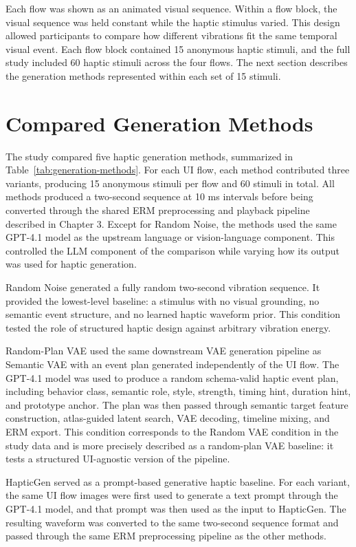 Each flow was shown as an animated visual sequence. Within a flow block, the visual sequence was held constant while the haptic stimulus varied. This design allowed participants to compare how different vibrations fit the same temporal visual event. Each flow block contained 15 anonymous haptic stimuli, and the full study included 60 haptic stimuli across the four flows. The next section describes the generation methods represented within each set of 15 stimuli.

\section{Compared Generation Methods}

The study compared five haptic generation methods, summarized in Table~\ref{tab:generation-methods}. For each UI flow, each method contributed three variants, producing 15 anonymous stimuli per flow and 60 stimuli in total. All methods produced a two-second sequence at 10 ms intervals before being converted through the shared ERM preprocessing and playback pipeline described in Chapter 3. Except for Random Noise, the methods used the same GPT-4.1 model as the upstream language or vision-language component. This controlled the LLM component of the comparison while varying how its output was used for haptic generation.



Random Noise generated a fully random two-second vibration sequence. It provided the lowest-level baseline: a stimulus with no visual grounding, no semantic event structure, and no learned haptic waveform prior. This condition tested the role of structured haptic design against arbitrary vibration energy.

Random-Plan VAE used the same downstream VAE generation pipeline as Semantic VAE with an event plan generated independently of the UI flow. The GPT-4.1 model was used to produce a random schema-valid haptic event plan, including behavior class, semantic role, style, strength, timing hint, duration hint, and prototype anchor. The plan was then passed through semantic target feature construction, atlas-guided latent search, VAE decoding, timeline mixing, and ERM export. This condition corresponds to the Random VAE condition in the study data and is more precisely described as a random-plan VAE baseline: it tests a structured UI-agnostic version of the pipeline.

HapticGen served as a prompt-based generative haptic baseline. For each variant, the same UI flow images were first used to generate a text prompt through the GPT-4.1 model, and that prompt was then used as the input to HapticGen. The resulting waveform was converted to the same two-second sequence format and passed through the same ERM preprocessing pipeline as the other methods.

